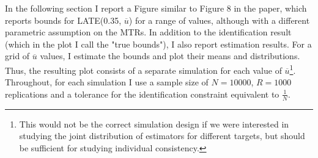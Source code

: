 \documentclass[11pt, a4paper, leqno]{article}
\begin{document}
In the following section I report a Figure similar to Figure 8 in the paper, which reports bounds for LATE(0.35, $\overline{u}$) for a range of values, although with a different parametric assumption on the MTRs.
In addition to the identification result (which in the plot I call the "true bounds"), I also report estimation results.
For a grid of $\overline{u}$ values, I estimate the bounds and plot their means and distributions. Thus, the resulting plot consists of a separate simulation for each value of $\overline{u}$\footnote{This would not be the correct simulation design if we were interested in studying the joint distribution of estimators for different targets, but should be sufficient for studying individual consistency.}.
Throughout, for each simulation I use a sample size of $N=10000$, $R=1000$ replications and a tolerance for the identification constraint equivalent to $\frac{1}{N}$.


\end{document}
